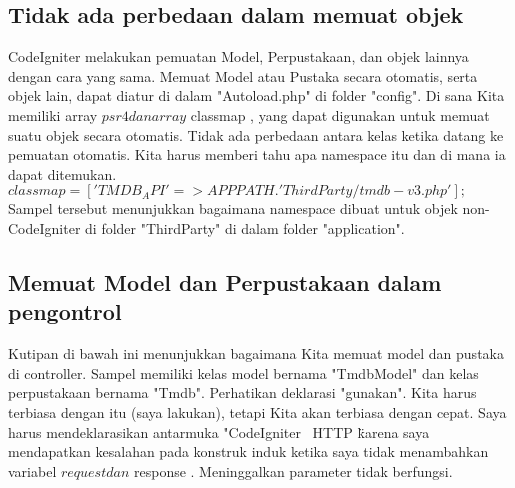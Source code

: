 \subsection{Tidak ada perbedaan dalam memuat objek}
CodeIgniter melakukan pemuatan Model, Perpustakaan, dan objek lainnya dengan cara yang sama. Memuat Model atau Pustaka secara otomatis, serta objek lain, dapat diatur di dalam "Autoload.php" di folder "config". Di sana Kita memiliki array $ psr4 dan array $ classmap , yang dapat digunakan untuk memuat suatu objek secara otomatis. Tidak ada perbedaan antara kelas ketika datang ke pemuatan otomatis. Kita harus memberi tahu apa namespace itu dan di mana ia dapat ditemukan.
$classmap = [
   'TMDB_API' => APPPATH . 'ThirdParty/tmdb-v3.php'
];$
Sampel tersebut menunjukkan bagaimana namespace dibuat untuk objek non-CodeIgniter di folder "ThirdParty" di dalam folder "application".

\subsection{Memuat Model dan Perpustakaan dalam pengontrol}
Kutipan di bawah ini  menunjukkan bagaimana Kita memuat model dan pustaka di controller.
Sampel memiliki kelas model bernama "TmdbModel" dan kelas perpustakaan bernama "Tmdb". Perhatikan deklarasi "gunakan". Kita harus terbiasa dengan itu (saya lakukan), tetapi Kita akan terbiasa dengan cepat. Saya harus mendeklarasikan antarmuka "CodeIgniter \ HTTP \" karena saya mendapatkan kesalahan pada konstruk induk ketika saya tidak menambahkan variabel $ request dan $ response . Meninggalkan parameter tidak berfungsi.

